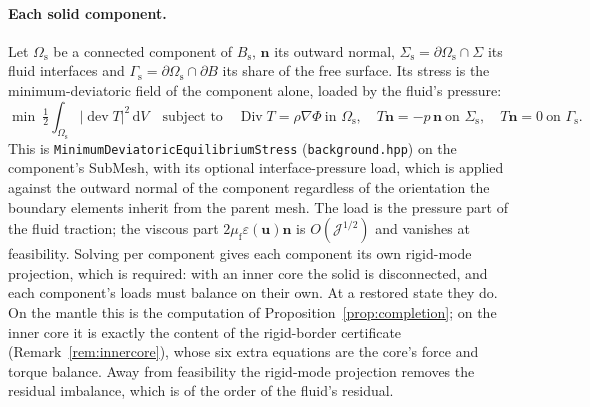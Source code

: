 \documentclass[11pt]{article}
\newcommand{\Jf}{\mathscr{J}}  %
\newcommand{\eps}{\varepsilon}
\newcommand{\Bs}{B_{\mathrm{s}}}
\newcommand{\bu}{\mathbf{u}}
\newcommand{\bn}{\mathbf{n}}
\newcommand{\dV}{\,\mathrm{d}V}
\newcommand{\dev}{\operatorname{dev}}
\newcommand{\Div}{\operatorname{Div}}
\begin{document}
\paragraph{Each solid component.} Let $\Omega_{\mathrm{s}}$ be a
connected component of $\Bs$, $\bn$ its outward normal,
$\Sigma_{\mathrm{s}} = \partial\Omega_{\mathrm{s}}\cap\Sigma$ its fluid
interfaces and $\Gamma_{\mathrm{s}} = \partial\Omega_{\mathrm{s}}\cap
\partial B$ its share of the free surface. Its stress is the
minimum-deviatoric field of the component alone, loaded by the fluid's
pressure:
\begin{equation}
  \min\ \tfrac12\int_{\Omega_{\mathrm{s}}}|\dev T|^{2}\dV
  \quad\text{subject to}\quad
  \Div T = \rho\nabla\Phi \ \text{in } \Omega_{\mathrm{s}}, \quad
  T\bn = -p\,\bn \ \text{on } \Sigma_{\mathrm{s}}, \quad
  T\bn = 0 \ \text{on } \Gamma_{\mathrm{s}} .
  \label{eq:solid-recovery}
\end{equation}
This is \texttt{MinimumDeviatoricEquilibriumStress}
(\texttt{background.hpp}) on the component's SubMesh, with its optional
interface-pressure load, which is applied against the outward normal of
the component regardless of the orientation the boundary elements
inherit from the parent mesh. The load is the pressure part of the fluid
traction; the viscous part $2\mu_{\mathrm{f}}\eps(\bu)\bn$ is
$O(\Jf ^{1/2})$ and vanishes at feasibility. Solving per component gives
each component its own rigid-mode projection, which is required: with an
inner core the solid is disconnected, and each component's loads must
balance on their own. At a restored state they do. On the mantle this is
the computation of Proposition~\ref{prop:completion}; on the inner core
it is exactly the content of the rigid-border certificate
(Remark~\ref{rem:innercore}), whose six extra equations are the core's
force and torque balance. Away from feasibility the rigid-mode
projection removes the residual imbalance, which is of the order of the
fluid's residual.
\end{document}
